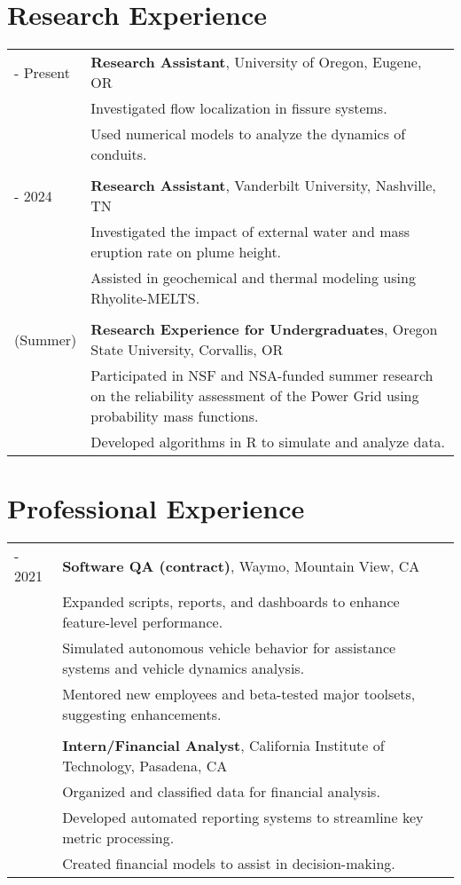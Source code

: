 \documentclass[a4paper,10pt]{article}
\begin{document}
\section*{Research Experience}
    \begin{tabularx}{\textwidth}{>{\raggedright\arraybackslash}p{2.5cm} X}
        2024 - Present & \textbf{Research Assistant}, University of Oregon, Eugene, OR \\
                       & Investigated flow localization in fissure systems. \\
                       & Used numerical models to analyze the dynamics of conduits. \\
        \\
        2021 - 2024    & \textbf{Research Assistant}, Vanderbilt University, Nashville, TN \\
                       & Investigated the impact of external water and mass eruption rate on plume height. \\
                       & Assisted in geochemical and thermal modeling using Rhyolite-MELTS. \\
        \\
        2019 (Summer)  & \textbf{Research Experience for Undergraduates}, Oregon State University, Corvallis, OR \\
                       & Participated in NSF and NSA-funded summer research on the reliability assessment of the Power Grid using probability mass functions. \\
                       & Developed algorithms in R to simulate and analyze data.
    \end{tabularx}

\section*{Professional Experience}
    \begin{tabularx}{\textwidth}{>{\raggedright\arraybackslash}p{2.5cm} X}
        2020 - 2021 & \textbf{Software QA (contract)}, Waymo, Mountain View, CA \\
                    & Expanded scripts, reports, and dashboards to enhance feature-level performance. \\
                    & Simulated autonomous vehicle behavior for assistance systems and vehicle dynamics analysis. \\
                    & Mentored new employees and beta-tested major toolsets, suggesting enhancements. \\
        \\
        2016        & \textbf{Intern/Financial Analyst}, California Institute of Technology, Pasadena, CA \\
                    & Organized and classified data for financial analysis. \\
                    & Developed automated reporting systems to streamline key metric processing. \\
                    & Created financial models to assist in decision-making.
    \end{tabularx}
\end{document}
